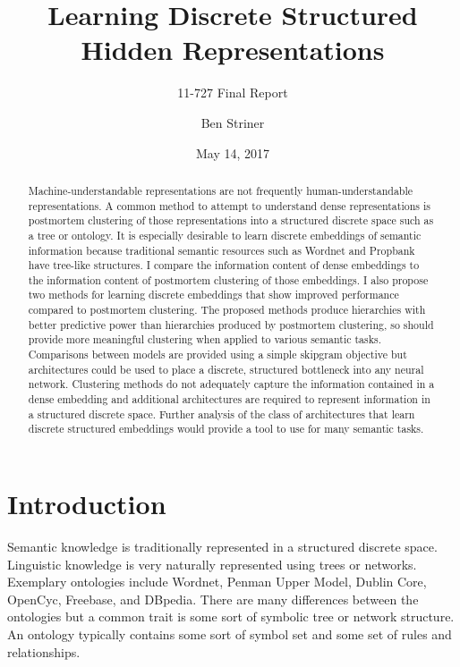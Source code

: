 \documentclass[sigconf]{acmart}
\begin{document}
\title{Learning Discrete Structured Hidden Representations}
\date{May 14, 2017}
\subtitle{11-727 Final Report}

\author{Ben Striner}


\begin{abstract}
Machine-understandable representations are not frequently human-understandable representations. A common method to attempt to understand dense representations is postmortem clustering of those representations into a structured discrete space such as a tree or ontology. It is especially desirable to learn discrete embeddings of semantic information because traditional semantic resources such as Wordnet and Propbank have tree-like structures. I compare the information content of dense embeddings to the information content of postmortem clustering of those embeddings. I also propose two methods for learning discrete embeddings that show improved performance compared to postmortem clustering. The proposed methods produce hierarchies with better predictive power than hierarchies produced by postmortem clustering, so should provide more meaningful clustering when applied to various semantic tasks. Comparisons between models are provided using a simple skipgram objective but architectures could be used to place a discrete, structured bottleneck into any neural network. Clustering methods do not adequately capture the information contained in a dense embedding and additional architectures are required to represent information in a structured discrete space. Further analysis of the class of architectures that learn discrete structured embeddings would provide a tool to use for many semantic tasks.
\end{abstract}

\maketitle

\section{Introduction}

Semantic knowledge is traditionally represented in a structured discrete space. Linguistic knowledge is very naturally represented using trees or networks. Exemplary ontologies include Wordnet, Penman Upper Model,  Dublin Core, OpenCyc, Freebase, and DBpedia. There are many differences between the ontologies but a common trait is some sort of symbolic tree or network structure. An ontology typically contains some sort of symbol set and some set of rules and relationships.
\end{document}
